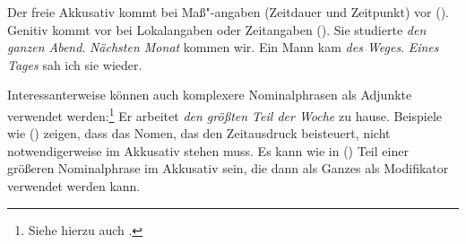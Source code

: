 Der freie Akkusativ kommt bei Maß"-angaben (Zeitdauer und Zeitpunkt)
vor (). Genitiv kommt vor bei Lokalangaben oder Zeitangaben ().
\eal
\ex Sie studierte \emph{den ganzen Abend}.
\ex \emph{Nächsten Monat} kommen wir.
\zl
\eal
\ex Ein Mann kam \emph{des Weges}.
\ex \emph{Eines Tages} sah ich sie wieder.
\zl

\noindent
Interessanterweise können auch komplexere Nominalphrasen als Adjunkte verwendet werden:\footnote{
  Siehe hierzu auch .
}
\ea
\label{bsp-den-groessten-Teil-der-Woche}
Er arbeitet \emph{den größten Teil der Woche} zu hause.
\z
Beispiele wie () zeigen, dass das Nomen, das den Zeitausdruck beisteuert, nicht
notwendigerweise im Akkusativ stehen muss. Es kann wie in () Teil einer größeren
Nominalphrase im Akkusativ sein, die dann als Ganzes als Modifikator verwendet werden kann.
%





